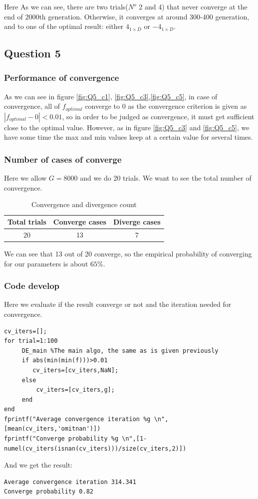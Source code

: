 \documentclass{CSArticle}[english]
\begin{document}
Here 
As we can see, there are two trials($N^o$ 2 and 4) that never converge at the end of 2000th generation. Otherwise, it converges at around 300-400 generation, and to one of the optimal result: either $4_{1\times D}$ or $-4_{1\times D}$.

\subsection{Question 5}
\subsubsection{Performance of convergence}
As we can see in figure \ref{fig:Q5_c1}, \ref{fig:Q5_c3},\ref{fig:Q5_c5}, in case of convergence, all of $f_{optimal}$ converge to 0 as the convergence criterion is given as $|f_{optimal}-0|<0.01$, so in order to be judged as convergence, it must get sufficient close to the optimal value. However, as in figure \ref{fig:Q5_c3} and \ref{fig:Q5_c5}, we have some time the max and min values keep at a certain value for several times.
\subsubsection{Number of cases of converge}
Here we allow $G=8000$ and we do 20 trials. We want to see the total number of convergence.\par
\begin{table}[h!]
\centering
\begin{tabular}{|c|c|c|}
\hline
Total trials & Converge cases & Diverge cases \\ \hline
20           & 13             & 7             \\ \hline
\end{tabular}
\caption{Convergence and divergence count}
\end{table}
We can see that 13 out of 20 converge, so the empirical probability of converging for our parameters is about $65\%$.
\subsubsection{Code develop}
\label{code_1}
Here we evaluate if the result converge or not and the iteration needed for convergence.
\begin{lstlisting}[style=MATLAB]
%% Evaluation
cv_iters=[];
for trial=1:100
     DE_main %The main algo, the same as is given previously
     if abs(min(min(f)))>0.01
        cv_iters=[cv_iters,NaN];
     else
         cv_iters=[cv_iters,g];
     end
end
fprintf("Average convergence iteration %g \n",[mean(cv_iters,'omitnan')]) 
fprintf("Converge probability %g \n",[1-numel(cv_iters(isnan(cv_iters)))/size(cv_iters,2)]) 
\end{lstlisting}
And we get the result:
\begin{lstlisting}[style=RESULT]
Average convergence iteration 314.341 
Converge probability 0.82 
\end{lstlisting}
\end{document}
